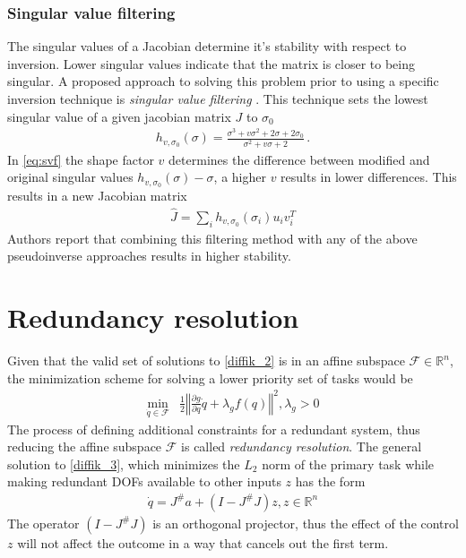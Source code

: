 \documentclass[times, utf8, diplomski, english]{fer}
\begin{document}
\subsubsection{Singular value filtering}
The singular values of a Jacobian determine it's stability with respect to inversion.
Lower singular values indicate that the matrix is closer to being singular.
A proposed approach to solving this problem prior to using a specific inversion technique is \textit{singular value filtering} \citep{colome2012redundant}. 
This technique sets the lowest singular value of a given jacobian matrix $J$ to $\sigma_0$
\begin{align}\label{eq:svf}
h_{v,\sigma_0}\left(\sigma\right) = \frac{\sigma^3 + v\sigma^2 + 2\sigma + 2\sigma_0}{\sigma^2 + v\sigma + 2}\,.
\end{align}
In \eqref{eq:svf} the shape factor $v$ determines the difference between modified and original singular values $h_{v,\sigma_0}(\sigma)-\sigma$, a higher $v$ results in lower differences. This results in a new Jacobian matrix
\begin{align} \label{eq:svf jacobian}
\hat{J}= \sum\limits_{i}{h_{v,\sigma_0}(\sigma_i)u_iv_i^T}
\end{align}
Authors report that combining this filtering method with any of the above pseudoinverse approaches results in higher stability.
\section{Redundancy resolution}\label{section:redundancy resolution}
Given that the valid set of solutions to \ref{diffik_2} is in an affine subspace $\mathcal{F} \in \mathbb{R}^n$, the minimization scheme for solving a lower priority set of tasks would be
\begin{align}
\label{diffik_3}
\min\limits_{\dot{q} \in \mathcal{F}} & \frac{1}{2}\left\Vert\frac{\partial g}{\partial q} \dot{q} + \lambda_{g}f\left(q\right)\right\Vert^2 , \lambda_{g} > 0
\end{align}
The process of defining additional constraints for a redundant system, thus reducing the affine subspace $\mathcal{F}$ is called \textit{redundancy resolution}.
The general solution to \eqref{diffik_3}, which minimizes the $L_2$ norm of the primary task while making redundant DOFs available to other inputs $z$ has the form
\begin{align}
\label{rresolution_0}
\dot{q} = J^{\#}a + \left(I - J^{\#}J\right)z ,  z \in \mathbb{R}^n
\end{align}
The operator $\left(I - J^{\#}J\right)$ is an orthogonal projector, thus the effect of the control $z$ will not affect the outcome in a way that cancels out the first term. 
\end{document}
